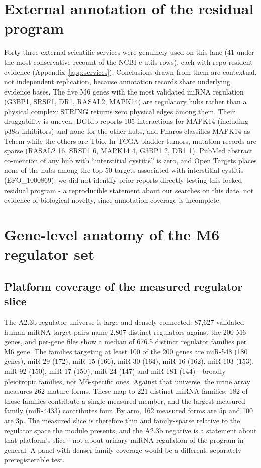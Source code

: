 \documentclass[11pt,a4paper]{article}
\begin{document}
\section{External annotation of the residual program}
Forty-three external scientific services were genuinely used on this lane (41
under the most conservative recount of the NCBI e-utils rows), each with
repo-resident evidence (Appendix~\ref{app:services}). Conclusions drawn from
them are contextual, not independent replication, because annotation records
share underlying evidence bases. The five M6 genes with the most validated
miRNA regulation (G3BP1, SRSF1, DR1, RASAL2, MAPK14) are regulatory hubs rather
than a physical complex: STRING returns zero physical edges among them. Their
druggability is uneven: DGIdb reports 105 interactions for MAPK14 (including
p38$\alpha$ inhibitors) and none for the other hubs, and Pharos classifies
MAPK14 as Tchem while the others are Tbio. In TCGA bladder tumors, mutation
records are sparse (RASAL2 16, SRSF1 6, MAPK14 4, G3BP1 2, DR1 1). PubMed
abstract co-mention of any hub with ``interstitial cystitis'' is zero, and
Open Targets places none of the hubs among the top-50 targets associated with
interstitial cystitis (EFO\_1000869): we did not identify prior reports directly
testing this locked residual program - a reproducible statement about our
searches on this date, not evidence of biological novelty, since annotation
coverage is incomplete.

\section{Gene-level anatomy of the M6 regulator set}

\subsection{Platform coverage of the measured regulator slice}
The A2.3b regulator universe is large and densely connected: 87,627 validated
human miRNA-target pairs name 2,807 distinct regulators against the 200 M6
genes, and per-gene files show a median of 676.5 distinct regulator families
per M6 gene. The families targeting at least 100 of the 200 genes are
miR-548 (180 genes), miR-29 (172), miR-15 (166), miR-30 (164), miR-16 (162),
miR-103 (153), miR-92 (150), miR-17 (150), miR-24 (147) and miR-181 (144) -
broadly pleiotropic families, not M6-specific ones. Against that universe, the
urine array measures 262 mature forms. These map to 221 distinct miRNA
families; 182 of those families contribute a single measured member, and the
largest measured family (miR-4433) contributes four. By arm, 162 measured
forms are 5p and 100 are 3p. The measured slice is therefore thin and
family-sparse relative to the regulator space the module presents, and the
A2.3b negative is a statement about that platform's slice - not about urinary
miRNA regulation of the program in general. A panel with denser family
coverage would be a different, separately preregisterable test.
\end{document}
